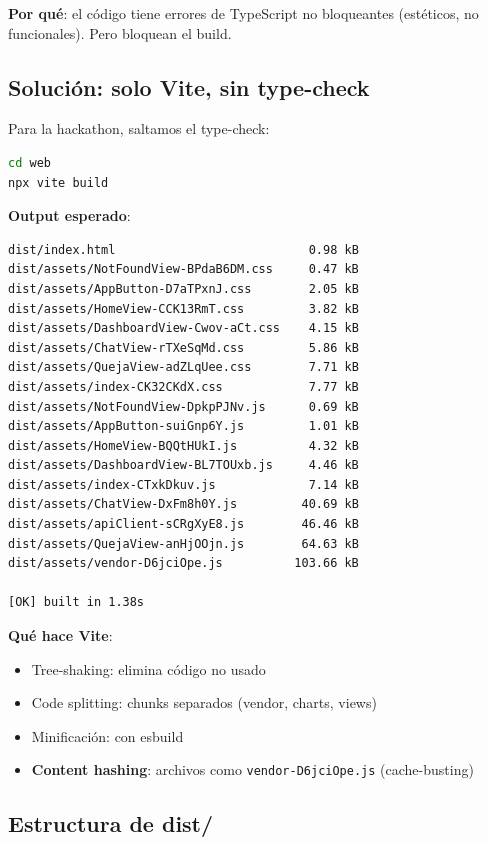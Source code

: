 \documentclass[11pt,a4paper,oneside]{article}
\begin{document}
\textbf{Por qu\'e}: el c\'odigo tiene errores de TypeScript no bloqueantes (est\'eticos, no funcionales). Pero bloquean el build.

\subsection{Soluci\'on: solo Vite, sin type-check}

Para la hackathon, saltamos el type-check:

\begin{lstlisting}[language=bash,caption={Build sin type-check}]
cd web
npx vite build
\end{lstlisting}

\textbf{Output esperado}:
\begin{lstlisting}[language=bash]
dist/index.html                           0.98 kB
dist/assets/NotFoundView-BPdaB6DM.css     0.47 kB
dist/assets/AppButton-D7aTPxnJ.css        2.05 kB
dist/assets/HomeView-CCK13RmT.css         3.82 kB
dist/assets/DashboardView-Cwov-aCt.css    4.15 kB
dist/assets/ChatView-rTXeSqMd.css         5.86 kB
dist/assets/QuejaView-adZLqUee.css        7.71 kB
dist/assets/index-CK32CKdX.css            7.77 kB
dist/assets/NotFoundView-DpkpPJNv.js      0.69 kB
dist/assets/AppButton-suiGnp6Y.js         1.01 kB
dist/assets/HomeView-BQQtHUkI.js          4.32 kB
dist/assets/DashboardView-BL7TOUxb.js     4.46 kB
dist/assets/index-CTxkDkuv.js             7.14 kB
dist/assets/ChatView-DxFm8h0Y.js         40.69 kB
dist/assets/apiClient-sCRgXyE8.js        46.46 kB
dist/assets/QuejaView-anHjOOjn.js        64.63 kB
dist/assets/vendor-D6jciOpe.js          103.66 kB

[OK] built in 1.38s
\end{lstlisting}

\textbf{Qu\'e hace Vite}:
\begin{itemize}
  \item Tree-shaking: elimina c\'odigo no usado
  \item Code splitting: chunks separados (vendor, charts, views)
  \item Minificaci\'on: con esbuild
  \item \textbf{Content hashing}: archivos como \texttt{vendor-D6jciOpe.js} (cache-busting)
\end{itemize}

\subsection{Estructura de dist/}
\end{document}

